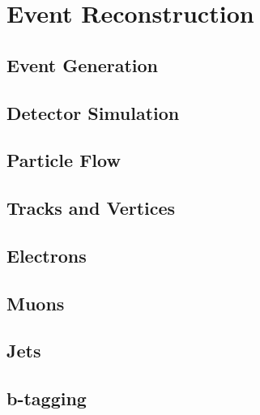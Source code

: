 \chapter{Event Reconstruction
\label{ch:reconstruction}}

\section{Event Generation}

\section{Detector Simulation}

\section{Particle Flow}

\section{Tracks and Vertices}

\section{Electrons}

\section{Muons}

\section{Jets}

\section{b-tagging}